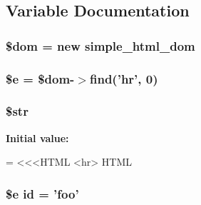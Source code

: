 \subsection{Variable Documentation}
\hypertarget{invalid__testcase_8php_a46127a794280dd592812c25b62af34b0}{
\subsubsection[{\$dom}]{\setlength{\rightskip}{0pt plus 5cm}\$dom = new {\bf simple\+\_\+html\+\_\+dom}}}\label{invalid__testcase_8php_a46127a794280dd592812c25b62af34b0}
\hypertarget{invalid__testcase_8php_ab74076a9b7e1d23d12b9e8d65e60315a}{
\subsubsection[{\$e}]{\setlength{\rightskip}{0pt plus 5cm}\$e = \$dom-\/$>$find('hr', 0)}}\label{invalid__testcase_8php_ab74076a9b7e1d23d12b9e8d65e60315a}
\hypertarget{invalid__testcase_8php_a7542d95618011800c61773127fa625cf}{
\subsubsection[{\$str}]{\setlength{\rightskip}{0pt plus 5cm}\$str}}\label{invalid__testcase_8php_a7542d95618011800c61773127fa625cf}
{\bfseries Initial value\+:}
\begin{DoxyCode}
= <<<HTML
<hr>
HTML
\end{DoxyCode}
\hypertarget{invalid__testcase_8php_af94d69fa7897fa25e80204500b8586eb}{
\subsubsection[{id}]{\setlength{\rightskip}{0pt plus 5cm}\$e id = '{\bf foo}'}}\label{invalid__testcase_8php_af94d69fa7897fa25e80204500b8586eb}
